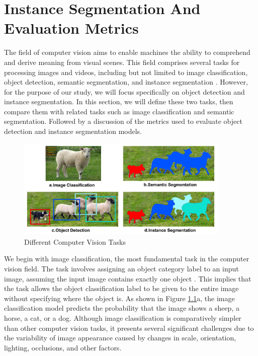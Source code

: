 \chapter{Instance Segmentation And Evaluation Metrics} \label{chap:segmentation_metric}

The field of computer vision aims to enable machines the ability to comprehend and derive meaning from visual scenes. This field comprises several tasks for processing images and videos, including but not limited to image classification, object detection, semantic segmentation, and instance segmentation \cite{overview_cv_task}. However, for the purpose of our study, we will focus specifically on object detection and instance segmentation. In this section, we will define these two tasks, then compare them with related tasks such as image classification and semantic segmentation. Followed by a discussion of the metrics used to evaluate object detection and instance segmentation models.

\begin{figure}[!ht]
    \centering
    \includegraphics[width=4in]{figures/diff_cv_tasks.jpeg}
    \caption{Different Computer Vision Tasks \cite{diff_detection_segmentation_task_fig}}
    \label{fig:diff_cv_tasks}
\end{figure}

We begin with image classification, the most fundamental task in the computer vision field. The task involves assigning an object category label to an input image, assuming the input image contains exactly one object \cite{overview_cv_task}. This implies that the task allows the object classification label to be given to the entire image without specifying where the object is. As shown in Figure \ref{fig:diff_cv_tasks}a, the image classification model predicts the probability that the image shows a sheep, a horse, a cat, or a dog. Although image classification is comparatively simpler than other computer vision tasks, it presents several significant challenges due to the variability of image appearance caused by changes in scale, orientation, lighting, occlusions, and other factors.

